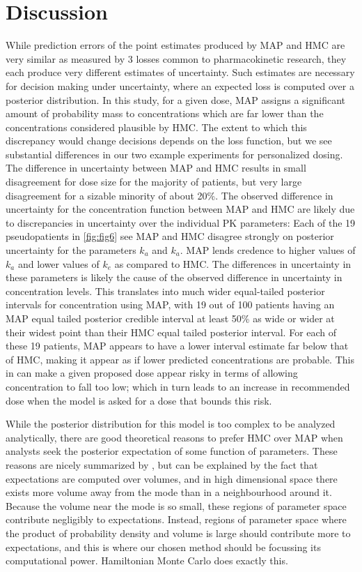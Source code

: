 \section{Discussion}

While prediction errors of the point estimates produced by MAP and HMC are very similar as measured by 3 losses common to pharmacokinetic research, they each produce very different estimates of uncertainty.  Such estimates are necessary for decision making under uncertainty, where an expected loss is computed over a posterior distribution.  In this study, for a given dose, MAP assigns a significant amount of probability mass to concentrations which are far lower than the concentrations considered plausible by HMC.  The extent to which this discrepancy would change decisions depends on the loss function, but we see substantial differences in our two example experiments for personalized dosing.  The difference in uncertainty between MAP and HMC results in small disagreement for dose size for the majority of patients, but very large disagreement for a sizable minority of about 20\%. The observed difference in uncertainty for the concentration function between MAP and HMC are likely due to discrepancies in uncertainty over the individual PK parameters: Each of the 19 pseudopatients in \cref{fig:fig6} see MAP and HMC disagree strongly on posterior uncertainty for the parameters $k_a$ and $k_a$.  MAP lends credence to higher values of $k_a$ and lower values of $k_e$ as compared to HMC. The differences in uncertainty in these parameters is likely the cause of the observed difference in uncertainty in concentration levels. This translates into much wider equal-tailed posterior intervals for concentration using MAP, with 19 out of 100 patients having an MAP equal tailed posterior credible interval at least 50\% as wide or wider at their widest point than their HMC equal tailed posterior interval. For each of these 19 patients, MAP appears to have a lower interval estimate far below that of HMC, making it appear as if lower predicted concentrations are probable. This in can make a given proposed dose appear risky in terms of allowing concentration to fall too low; which in turn leads to an increase in recommended dose when the model is asked for a dose that bounds this risk.

While the posterior distribution for this model is too complex to be analyzed analytically, there are good theoretical reasons to prefer HMC over MAP when analysts seek the posterior expectation of some function of parameters. These reasons are nicely summarized by \cite{Betancourt2017-ak}, but can be explained by the fact that expectations are computed over volumes, and in high dimensional space there exists more volume away from the mode than in a neighbourhood around it. Because the volume near the mode is so small, these regions of parameter space contribute negligibly to expectations.  Instead, regions of parameter space where the product of probability density and volume is large should contribute more to expectations, and this is where our chosen method should be focussing its computational power.  Hamiltonian Monte Carlo does exactly this.

